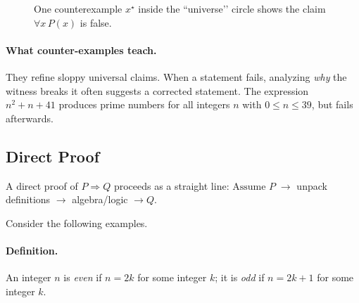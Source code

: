 \begin{figure}[h]
\begin{center}
\end{center} 
\caption{One counterexample $x^\star$ inside the ``universe’’ circle shows the claim $\forall x \, P(x)$ is false.}
\end{figure}

\paragraph{What counter-examples teach.}
They refine sloppy universal claims. When a statement fails, analyzing \emph{why} the witness breaks it  often suggests a corrected statement. The expression $n^2 + n + 41$ produces prime numbers for all integers $n$ with $0 \le n \le 39$, but fails afterwards. 

\subsection{Direct Proof}
A direct proof of \(P \Rightarrow Q\) proceeds as a straight line: \(\text{Assume }P \;\rightarrow\) unpack definitions \(\rightarrow\) algebra/logic \(\rightarrow Q\).

Consider the following examples.

\paragraph{Definition.}
An integer \(n\) is \emph{even} if \(n=2k\) for some integer \(k\); it is \emph{odd} if \(n=2k+1\) for some integer \(k\).


